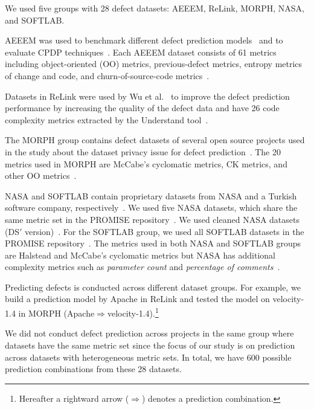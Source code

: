 We used five groups with 28 defect datasets: AEEEM, ReLink, MORPH, NASA,
and SOFTLAB.

AEEEM was used to benchmark different defect
prediction models~\cite{DAmbros12} and to evaluate CPDP
techniques~\cite{He14,Nam13}.
Each AEEEM dataset consists of 61 metrics including object-oriented (OO) metrics,
previous-defect metrics, entropy metrics of change and code, and churn-of-source-code
metrics~\cite{DAmbros12}.

Datasets in ReLink were used by Wu et
al.~\cite{Wu11} to improve the defect prediction performance by increasing the quality of the
defect data and have 26 code complexity metrics extracted by the Understand
tool~\cite{Understand}.

The MORPH group contains defect datasets of several open source projects used in
the study about the dataset privacy issue for defect prediction~\cite{Peters12}.
The 20 metrics used in MORPH are McCabe's cyclomatic metrics, CK metrics, and
other OO metrics~\cite{Peters12}.

NASA and SOFTLAB contain proprietary
datasets from NASA and a Turkish software company, respectively~\cite{Turhan09}.
We used five NASA datasets, which share the same metric set in the PROMISE
repository~\cite{promise12,Shepperd13}. We used cleaned NASA datasets (DS$'$ version)~\cite{Shepperd13}.
For the SOFTLAB group, we used all SOFTLAB datasets in the PROMISE
repository~\cite{promise12}. The metrics used in both NASA and SOFTLAB groups
are Halstead and McCabe's cyclomatic metrics but NASA has additional
 complexity metrics such as {\em parameter count} and {\em percentage of comments}~\cite{promise12}.

Predicting defects is conducted across different dataset
groups.
For example, we build a prediction model by Apache in ReLink and tested the
model on velocity-1.4 in MORPH
(Apache$\Rightarrow$velocity-1.4).\footnote{Hereafter a rightward arrow
($\Rightarrow$) denotes a prediction combination.}

We did not conduct defect prediction across projects in the same group
where datasets have the same metric set since the focus of our study is on prediction
across datasets with heterogeneous metric sets.
In total, we have 600 possible prediction combinations from these 28 datasets.


